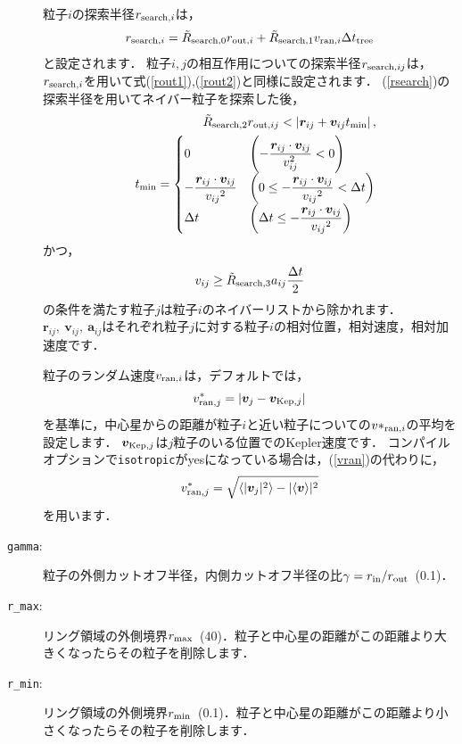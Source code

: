 \documentclass[12pt,a4paper,dvipdfmx]{jsarticle}
\begin{document}
\begin{description}
粒子$i$の探索半径$r_{{\rm search},i}$は，
\begin{equation}
r_{{\rm search},i}=\tilde{R}_{\rm search,0}r_{{\rm out},i}+\tilde{R}_{\rm search,1}v_{{\rm ran},i}\Delta t_{\rm tree}\label{rsearch}
\end{equation}
と設定されます．
粒子$i,j$の相互作用についての探索半径$r_{{\rm search},ij}$は，$r_{{\rm search},i}$を用いて式(\ref{rout1}),(\ref{rout2})と同様に設定されます．
(\ref{rsearch})の探索半径を用いてネイバー粒子を探索した後，
\begin{eqnarray}
&&\tilde{R}_{\rm  search,2}{r_{{\rm out},ij}} < \left| \bm{r}_{ij}+\bm{v}_{ij}t_{\rm min} \right|,\\
&&t_{\rm min}=
\begin{cases}
0 & \left(-\displaystyle\frac{\bm{r}_{ij}\cdot\bm{v}_{ij}}{{v}_{ij}^2}<0\right) \\
-\displaystyle\frac{\bm{r}_{ij}\cdot\bm{v}_{ij}}{{v_{ij}}^2} & 
\left(0\leq -\displaystyle\frac{\bm{r}_{ij}\cdot\bm{v}_{ij}}{{v_{ij}}^2}<\Delta t\right)\\
\Delta t & \left(\Delta t\leq -\displaystyle\frac{\bm{r}_{ij}\cdot\bm{v}_{ij}}{{v_{ij}}^2}\right)
\end{cases}
\end{eqnarray}
かつ，
\begin{eqnarray}
v_{ij} \geq \tilde{R}_{\rm  search,3}a_{ij}\frac{\Delta t}{2}
\end{eqnarray}
の条件を満たす粒子$j$は粒子$i$のネイバーリストから除かれます．
$\bm{r}_{ij},\ \bm{v}_{ij},\ \bm{a}_{ij}$はそれぞれ粒子$j$に対する粒子$i$の相対位置，相対速度，相対加速度です．

粒子のランダム速度$v_{{\rm ran},i}$は，デフォルトでは，
\begin{equation}
v^{*}_{{\rm ran},j}=\left|\bm{v}_{j}-\bm{v}_{{\rm Kep},j}\right|\label{vran}
\end{equation}
を基準に，中心星からの距離が粒子$i$と近い粒子についての$v*_{{\rm ran},i}$の平均を設定します．
$\bm{v}_{{\rm Kep},j}$は$j$粒子のいる位置でのKepler速度です．
コンパイルオプションで\texttt{isotropic}がyesになっている場合は，(\ref{vran})の代わりに，
\begin{equation}
v^{*}_{{\rm ran},j}=\sqrt{\langle |\bm{v}_{j}|^{2}\rangle-|\langle \bm{v}\rangle|^{2}}
\end{equation}
を用います．

\item[\texttt{gamma}:]
粒子の外側カットオフ半径，内側カットオフ半径の比$\gamma=r_{\rm in}/r_{\rm out}$\ (0.1)．
\item[\texttt{r\_max}:]
リング領域の外側境界$r_{\rm max}$\ (40)．粒子と中心星の距離がこの距離より大きくなったらその粒子を削除します．
\item[\texttt{r\_min}:]
リング領域の外側境界$r_{\rm min}$\ (0.1)．粒子と中心星の距離がこの距離より小さくなったらその粒子を削除します．
\end{description}
\end{document}
